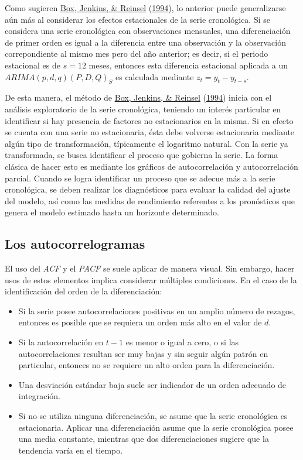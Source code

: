 \documentclass[
]{article}
\providecommand{\tightlist}{%
  \setlength{\itemsep}{0pt}\setlength{\parskip}{0pt}}
\begin{document}
Como sugieren \protect\hyperlink{ref-box-jenkins}{Box, Jenkins, \&
Reinsel} (\protect\hyperlink{ref-box-jenkins}{1994}), lo anterior puede
generalizarse aún más al considerar los efectos estacionales de la serie
cronológica. Si se considera una serie cronológica con observaciones
mensuales, una diferenciación de primer orden es igual a la diferencia
entre una observación y la observación correpondiente al mismo mes pero
del año anterior; es decir, si el periodo estacional es de \(s=12\)
meses, entonces esta diferencia estacional aplicada a un
\(ARIMA(p,d,q)(P,D,Q)_S\) es calculada mediante \(z_t=y_t-y_{t-s}\).

De esta manera, el método de \protect\hyperlink{ref-box-jenkins}{Box,
Jenkins, \& Reinsel} (\protect\hyperlink{ref-box-jenkins}{1994}) inicia
con el análisis exploratorio de la serie cronológica, teniendo un
interés particular en identificar si hay presencia de factores no
estacionarios en la misma. Si en efecto se cuenta con una serie no
estacionaria, ésta debe volverse estacionaria mediante algún tipo de
transformación, típicamente el logaritmo natural. Con la serie ya
transformada, se busca identificar el proceso que gobierna la serie. La
forma clásica de hacer esto es mediante los gráficos de autocorrelación
y autocorrelación parcial. Cuando se logra identificar un proceso que se
adecue más a la serie cronológica, se deben realizar los diagnósticos
para evaluar la calidad del ajuste del modelo, así como las medidas de
rendimiento referentes a los pronósticos que genera el modelo estimado
hasta un horizonte determinado.

\subsection{Los autocorrelogramas}

El uso del \emph{ACF} y el \emph{PACF} se suele aplicar de manera
visual. Sin embargo, hacer usos de estos elementos implica considerar
múltiples condiciones. En el caso de la identificación del orden de la
diferenciación:

\begin{itemize}
\tightlist
\item
  Si la serie posee autocorrelaciones positivas en un amplio número de
  rezagos, entonces es posible que se requiera un orden más alto en el
  valor de \(d\).
\item
  Si la autocorrelación en \(t-1\) es menor o igual a cero, o si las
  autocorrelaciones resultan ser muy bajas y sin seguir algún patrón en
  particular, entonces no se requiere un alto orden para la
  diferenciación.
\item
  Una desviación estándar baja suele ser indicador de un orden adecuado
  de integración.
\item
  Si no se utiliza ninguna diferenciación, se asume que la serie
  cronológica es estacionaria. Aplicar una diferenciación asume que la
  serie cronológica posee una media constante, mientras que dos
  diferenciaciones sugiere que la tendencia varía en el tiempo.
\end{itemize}
\end{document}
